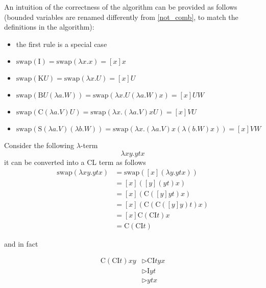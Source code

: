 \documentclass[a4paper, 12pt]{report}
\begin{document}
    An intuition of the correctness of the algorithm can be provided as follows (bounded variables are renamed differently from \cref{not_comb}, to match the definitions in the algorithm):

    \begin{itemize}
        \item the first rule is a special case
        \item $\mathrm{swap}(\mathrm I) = \mathrm{swap}(\lambda x.x) = [x] x$
        \item $\mathrm{swap}(\mathrm K U) = \mathrm{swap}(\lambda x.U) = [x]U$
        \item $\mathrm{swap}(\mathrm B U(\lambda a.W))=\mathrm{swap}(\lambda x.U(\lambda a.W)x) = [x]UW$
        \item $\mathrm{swap}(\mathrm C(\lambda a.V)U) = \mathrm{swap}(\lambda x.(\lambda a.V)xU) = [x]VU$
        \item $\mathrm{swap}(\mathrm S (\lambda a. V)(\lambda b . W) ) = \mathrm{swap}(\lambda x.(\lambda a. V)x(\lambda(b.W)x)) = [x]VW$
    \end{itemize}

    \begin{example}
        Consider the following $\lambda$-term $$\lambda xy. ytx$$ it can be converted into a CL term as follows
        \begin{equation*}
            \begin{split}
                \mathrm{swap}(\lambda xy. ytx) &= \mathrm{swap}([x](\lambda y. ytx)) \\
                                               &= [x]([y](yt)x) \\
                                               &= [x](\mathrm C([y]yt)x) \\
                                               &= [x](\mathrm C(\mathrm C([y]y)t)x) \\
                                               &= [x]\mathrm C(\mathrm C \mathrm I t)x \\
                                               &= \mathrm C(\mathrm C \mathrm It)
            \end{split}
        \end{equation*}

        and in fact

        \begin{equation*}
            \begin{split}
                \mathrm C (\mathrm C\mathrm I t)xy &\triangleright \mathrm C \mathrm I t y x \\
                                                   &\triangleright \mathrm I y t \\
                                                   &\triangleright ytx
            \end{split}
        \end{equation*}
    \end{example}
\end{document}
